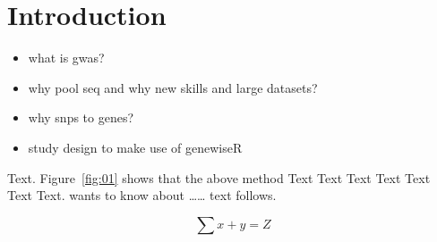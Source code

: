 \documentclass{bioinfo}
\begin{document}
\section{Introduction}

\begin{itemize}
\item what is gwas?
\item why pool seq and why new skills and large datasets?
\item why snps to genes?
\item study design to make use of genewiseR
\end{itemize}


 Text. Figure~\ref{fig:01} shows that the above method  Text Text Text Text  Text Text Text.  \citep{Bag01} wants to know about …… text follows.

\begin{equation}
\sum x+ y =Z\label{eq:01}
\end{equation}
\end{document}
